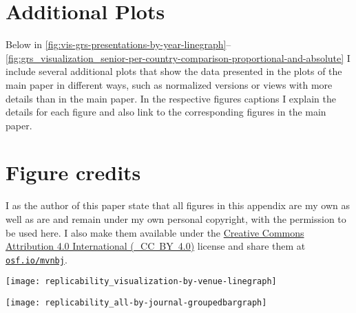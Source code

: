 \documentclass[conference]{vgtc}                     %
\newcommand{\ie}{i.\,e.}
\newcommand{\osfid}{mvnbj}
\begin{document}
\section{Additional Plots}
\label{app:plots}

Below in \autoref{fig:vis-grs-presentations-by-year-linegraph}--\ref{fig:grs_visualization_senior-per-country-comparison-proportional-and-absolute} I include several additional plots that show the data presented in the plots of the main paper in different ways, such as normalized versions or views with more details than in the main paper. In the respective figures captions I explain the details for each figure and also link to the corresponding figures in the main paper.

\section*{Figure credits}
\label{sec:figure_credits_appx}

I as the author of this paper state that all figures in this appendix are my own as well as are and remain under my own personal copyright, with the permission to be used here. I also make them available under the \href{https://creativecommons.org/licenses/by/4.0/}{Creative Commons At\-tri\-bu\-tion 4.0 International (\ccLogo\,\ccAttribution\ \mbox{CC BY 4.0})} license and share them at \href{https://osf.io/\osfid/}{\texttt{osf.io/\osfid}}.

\begin{figure*}
	\centering
	\texttt{[image: replicability\_visualization-by-venue-linegraph]}
	\caption{Line graph version of \autoref{fig:teaser} (but without the stacking aspect of \autoref{fig:teaser}, so here I show one line for only the GRSI-awarded papers of the venue plus one line for all papers of a venue): Papers that can clearly be classified as visualization work (visualization conferences and special issues in journals) by \emph{presentation} year (\ie, based on the \emph{conference years}, in which the papers were presented) and their subset with GRS.\textsuperscript{\ref{foot:vis_presentations}}}
	\label{fig:vis-grs-presentations-by-year-linegraph}
\end{figure*}

\begin{figure*}
	\centering
	\texttt{[image: replicability\_all-by-journal-groupedbargraph]}
	\caption{Bar chart version of \autoref{fig:grs-overall}: Overall development of papers with GRS, by publication venues (and their article \emph{publication} years).}
	\label{fig:grs-overall-bars}
\end{figure*}
\end{document}
